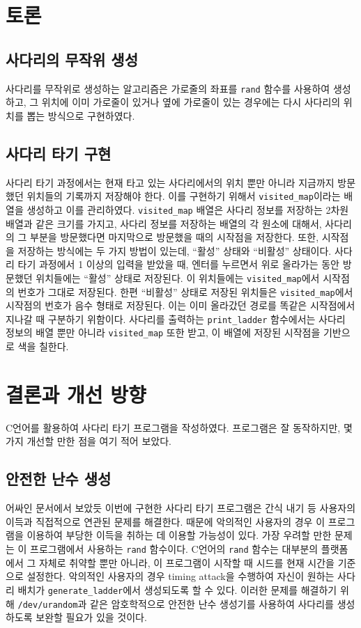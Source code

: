 \documentclass[titlepage]{article}
\begin{document}
\section{토론}

\subsection{사다리의 무작위 생성}
사다리를 무작위로 생성하는 알고리즘은 가로줄의 좌표를 \texttt{rand} 함수를 사용하여 생성하고, 그 위치에 이미 가로줄이 있거나 옆에 가로줄이 있는 경우에는 다시 사다리의 위치를 뽑는 방식으로 구현하였다.

\subsection{사다리 타기 구현}
사다리 타기 과정에서는 현재 타고 있는 사다리에서의 위치 뿐만 아니라 지금까지 방문했던 위치들의 기록까지 저장해야 한다. 이를 구현하기 위해서 \texttt{visited\_map}이라는 배열을 생성하고 이를 관리하였다. \texttt{visited\_map} 배열은 사다리 정보를 저장하는 2차원 배열과 같은 크기를 가지고, 사다리 정보를 저장하는 배열의 각 원소에 대해서, 사다리의 그 부분을 방문했다면 마지막으로 방문했을 때의 시작점을 저장한다. 또한, 시작점을 저장하는 방식에는 두 가지 방법이 있는데, ``활성'' 상태와 ``비활성'' 상태이다. 사다리 타기 과정에서 1 이상의 입력을 받았을 때, 엔터를 누르면서 위로 올라가는 동안 방문했던 위치들에는 ``활성'' 상태로 저장된다. 이 위치들에는 \texttt{visited\_map}에서 시작점의 번호가 그대로 저장된다. 한편 ``비활성'' 상태로 저장된 위치들은 \texttt{visited\_map}에서 시작점의 번호가 음수 형태로 저장된다. 이는 이미 올라갔던 경로를 똑같은 시작점에서 지나갈 때 구분하기 위함이다. 사다리를 출력하는 \texttt{print\_ladder} 함수에서는 사다리 정보의 배열 뿐만 아니라 \texttt{visited\_map} 또한 받고, 이 배열에 저장된 시작점을 기반으로 색을 칠한다.

\section{결론과 개선 방향}

C언어를 활용하여 사다리 타기 프로그램을 작성하였다. 프로그램은 잘 동작하지만, 몇 가지 개선할 만한 점을 여기 적어 보았다.

\subsection{안전한 난수 생성}
어싸인 문서에서 보았듯 이번에 구현한 사다리 타기 프로그램은 간식 내기 등 사용자의 이득과 직접적으로 연관된 문제를 해결한다. 때문에 악의적인 사용자의 경우 이 프로그램을 이용하여 부당한 이득을 취하는 데 이용할 가능성이 있다. 가장 우려할 만한 문제는 이 프로그램에서 사용하는 \texttt{rand} 함수이다. C언어의 \texttt{rand} 함수는 대부분의 플랫폼에서 그 자체로 취약할 뿐만 아니라, 이 프로그램이 시작할 때 시드를 현재 시간을 기준으로 설정한다. 악의적인 사용자의 경우 timing attack을 수행하여 자신이 원하는 사다리 배치가 \texttt{generate\_ladder}에서 생성되도록 할 수 있다. 이러한 문제를 해결하기 위해 \texttt{/dev/urandom}과 같은 암호학적으로 안전한 난수 생성기를 사용하여 사다리를 생성하도록 보완할 필요가 있을 것이다.
\end{document}
